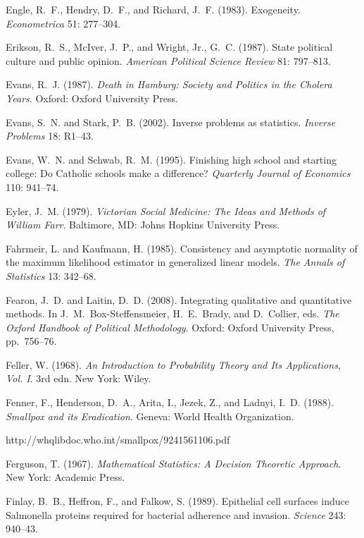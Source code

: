 \smallskip\noindent
Engle, R.~F., Hendry, D.~F., and Richard, J.~F. (1983).
Exogeneity.
{\it Econometrica\/} 51: 277--304.

\smallskip\noindent
Erikson, R.~S., McIver, J.~P., and Wright, Jr., G.~C. (1987).
State political culture and public opinion.
{\it American Political Science Review\/} 81: 797--813.

\smallskip\noindent
Evans, R.~J. (1987).
{\it Death in Hamburg: Society and Politics in the Cholera Years\/}.
Oxford: Oxford University Press.

\smallskip\noindent
Evans, S.~N. and Stark, P.~B. (2002).
Inverse problems as statistics.
{\it Inverse Problems\/} 18: R1--43.

\smallskip\noindent
Evans, W.~N. and Schwab, R.~M. (1995).
Finishing high school and starting college: Do Catholic schools make a difference?
{\it Quarterly Journal of Economics\/} {110}: 941--74.

\smallskip\noindent
Eyler, J.~M. (1979).
{\it Victorian Social Medicine: The Ideas and Methods of William Farr\/}.
Baltimore, MD: Johns Hopkins University Press.

\smallskip\noindent
Fahrmeir, L. and Kaufmann, H. (1985).
Consistency and asymptotic normality of the maximum likelihood estimator in generalized linear models.
{\it The Annals of Statistics\/} 13: 342--68.

\smallskip\noindent
Fearon, J.~D. and Laitin, D.~D. (2008).
Integrating qualitative and quantitative methods.
In J.~M.~Box-Steffensmeier, H.~E.~Brady, and D.~Collier, eds.
{\it The Oxford Handbook of Political Methodology\/}.
Oxford: Oxford University Press, pp.~756--76.

\smallskip\noindent
Feller, W. (1968).
{\it An Introduction to Probability Theory and Its Applications, Vol. I\/}. 3rd edn.
New York: Wiley.

\smallskip\noindent
Fenner, F., Henderson, D.~A., Arita, I., Jezek, Z., and Ladnyi, I.~D. (1988).
{\it Smallpox and its Eradication\/}.
Geneva: World Health Organization.

\noindent\hskip 10pt
http://whqlibdoc.who.int/smallpox/9241561106.pdf

\smallskip\noindent
Ferguson, T. (1967).
{\it  Mathematical Statistics:  A Decision Theoretic Approach\/}.
New York: Academic Press.

\smallskip\noindent
Finlay, B.~B., Heffron, F., and Falkow, S. (1989).
Epithelial cell surfaces induce Salmonella proteins required for bacterial adherence and invasion.
{\it Science\/} 243: 940--43.


